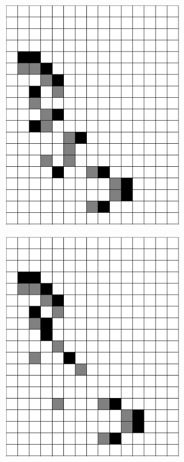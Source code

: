 \documentclass[12pt]{article}
\numberwithin{figure}{section} %
\begin{document}
\begin{figure}[H]
\begin{subfigure}{0.3\textwidth}
     		\includegraphics[width=\linewidth]{Section4/29.5}
     		\subcaption{}
   	\end{subfigure}
   	\begin{subfigure}{0.3\textwidth}
     		\centering
     		\includegraphics[width=\linewidth]{Section4/29.6}

\end{subfigure}
\end{figure}
\end{document}
